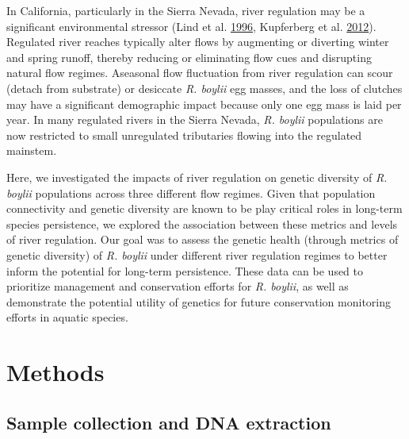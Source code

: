 \documentclass[twoside,12pt,final]{ucthesis-CA2012} %
\begin{document}
\begin{ucmainmatter}
In California, particularly in the Sierra Nevada, river regulation may
be a significant environmental stressor (Lind et al.
\protect\hyperlink{ref-lind_effects_1996}{1996}, Kupferberg et al.
\protect\hyperlink{ref-kupferberg_effects_2012}{2012}). Regulated river
reaches typically alter flows by augmenting or diverting winter and
spring runoff, thereby reducing or eliminating flow cues and disrupting
natural flow regimes. Aseasonal flow fluctuation from river regulation
can scour (detach from substrate) or desiccate \emph{R. boylii} egg
masses, and the loss of clutches may have a significant demographic
impact because only one egg mass is laid per year. In many regulated
rivers in the Sierra Nevada, \emph{R. boylii} populations are now
restricted to small unregulated tributaries flowing into the regulated
mainstem.

\par

Here, we investigated the impacts of river regulation on genetic
diversity of \emph{R. boylii} populations across three different flow
regimes. Given that population connectivity and genetic diversity are
known to be play critical roles in long-term species persistence, we
explored the association between these metrics and levels of river
regulation. Our goal was to assess the genetic health (through metrics
of genetic diversity) of \emph{R. boylii} under different river
regulation regimes to better inform the potential for long-term
persistence. These data can be used to prioritize management and
conservation efforts for \emph{R. boylii}, as well as demonstrate the
potential utility of genetics for future conservation monitoring efforts
in aquatic species.

\hypertarget{methods}{%
\section{Methods}\label{methods}}

\hypertarget{ch1samplecollection}{%
\subsection{Sample collection and DNA
extraction}\label{ch1samplecollection}}


\end{ucmainmatter}
\end{document}
